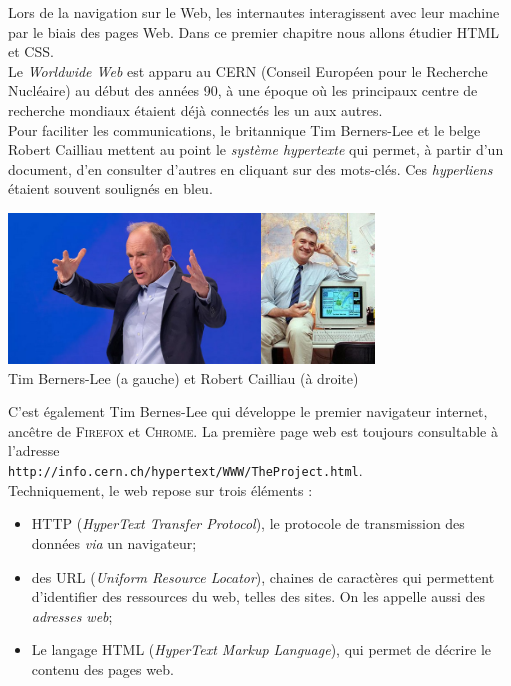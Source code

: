 
Lors de la navigation sur le Web, les internautes interagissent avec leur machine par le biais
des pages Web. Dans ce premier chapitre nous allons étudier \textsc{HTML} et \textsc{CSS}.\\
Le \textit{Worldwide Web} est apparu au \textsc{CERN} (Conseil Européen pour le Recherche Nucléaire) au début des années 90, à une époque où les 
principaux centre de recherche mondiaux étaient déjà connectés les un aux autres.\\
Pour faciliter les communications, le britannique Tim Berners-Lee et le belge Robert Cailliau mettent au point le \textit{système hypertexte} qui 
permet, à partir d'un document, d'en consulter d'autres en cliquant sur des mots-clés. Ces \textit{hyperliens} étaient souvent soulignés en bleu.
\begin{center}
\includegraphics[height=4cm]{ch-web1/img/tbl.jpg}\hspace{3em}\includegraphics[height=4cm]{ch-web1/img/rc.jpg}\\
\scriptsize
Tim Berners-Lee (a gauche) et Robert Cailliau (à droite)
\end{center}
C'est également Tim Bernes-Lee qui développe le premier navigateur internet, ancêtre de \textsc{Firefox} et \textsc{Chrome}.
La première page web est toujours consultable à l'adresse \\\texttt{http://info.cern.ch/hypertext/WWW/TheProject.html}.\\

Techniquement, le web repose sur trois éléments :
\begin{itemize}
	\item	\textsc{HTTP} (\textit{HyperText Transfer Protocol}), le protocole de transmission des données \textit{via} un navigateur;
	\item 	des \textsc{URL} (\textit{Uniform Resource Locator}), chaines de caractères qui permettent d'identifier des ressources du web, telles des 
	sites. On les appelle aussi des \textit{adresses web};
	\item 	Le langage \textsc{HTML} (\textit{HyperText Markup Language}), qui permet de décrire le contenu des pages web.
\end{itemize}


